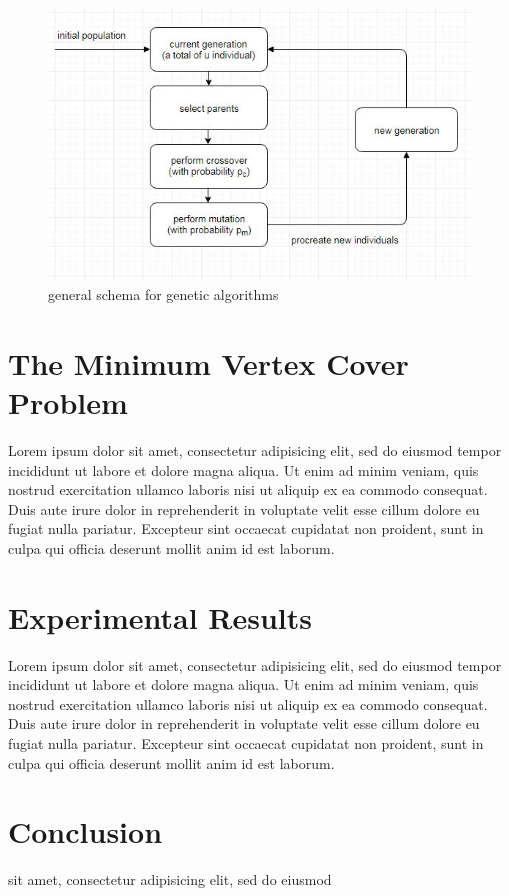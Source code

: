 \documentclass[12pt]{article}
\begin{document}
\begin{figure}[ht]
\centering
\includegraphics[width=1\textwidth]{ga}
\caption{general schema for genetic algorithms}
\label{fig:ga}
\end{figure}



\section{The Minimum Vertex Cover Problem}
Lorem \cite{einstein} ipsum dolor sit amet, consectetur adipisicing elit, sed do eiusmod
tempor incididunt ut labore et dolore magna aliqua. Ut enim ad minim veniam,
quis nostrud exercitation ullamco laboris nisi ut aliquip ex ea commodo
consequat. Duis aute irure dolor in reprehenderit in voluptate velit esse
cillum dolore eu fugiat nulla pariatur. Excepteur sint occaecat cupidatat non
proident, sunt in culpa qui officia deserunt mollit anim id est laborum.


\section{Experimental Results}
Lorem \cite{dirac} ipsum dolor sit amet, consectetur adipisicing elit, sed do eiusmod
tempor incididunt ut labore et dolore magna aliqua. Ut enim ad minim veniam,
quis nostrud exercitation ullamco laboris nisi ut aliquip ex ea commodo
consequat. Duis aute irure dolor in reprehenderit in voluptate velit esse
cillum dolore eu fugiat nulla pariatur. Excepteur sint occaecat cupidatat non
proident, sunt in culpa qui officia deserunt mollit anim id est laborum.


\section{Conclusion}
sit amet, consectetur adipisicing elit, sed do eiusmod


\pagebreak


\cleardoublepage{}
%
%
\printbibliography

\end{document}
